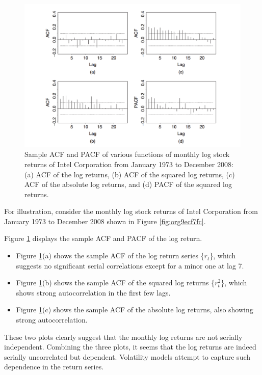 \documentclass[a4paper,11pt]{article}
\begin{document}
\begin{figure}[htbp]
\centering
\includegraphics[width=\textwidth]{img/acf_intel.png}
\caption{\label{fig:org1ebb27a}
Sample ACF and PACF of various functions of monthly log stock returns of Intel Corporation from January 1973 to December 2008: (a) ACF of the log returns, (b) ACF of the squared log returns, (c) ACF of the absolute log returns, and (d) PACF of the squared log returns.}
\end{figure}

For illustration, consider the monthly log stock returns of Intel
Corporation from January 1973 to December 2008 shown in Figure
\ref{fig:org9ecf7fc}. 

Figure \ref{fig:org1ebb27a} displays the sample ACF and PACF of the
log return. 
\begin{itemize}
\item Figure \ref{fig:org1ebb27a}(a) shows the sample ACF of the log
return series \{\(r_t\)\}, which suggests no significant serial correlations
except for a minor one at lag 7.
\item Figure \ref{fig:org1ebb27a}(b) shows the sample ACF of the squared log returns
\{\(r^2_t\)\}, which shows strong autocorrelation in the first few
lags.
\item Figure  \ref{fig:org1ebb27a}(c) shows the sample ACF of the
absolute log returns, also showing strong autocorrelation.
\end{itemize}

These two plots clearly suggest that the monthly log returns are not
serially independent. Combining the three plots, it seems that the
log returns are indeed serially uncorrelated but
dependent. Volatility models attempt to capture such dependence in
the return series.
\end{document}
